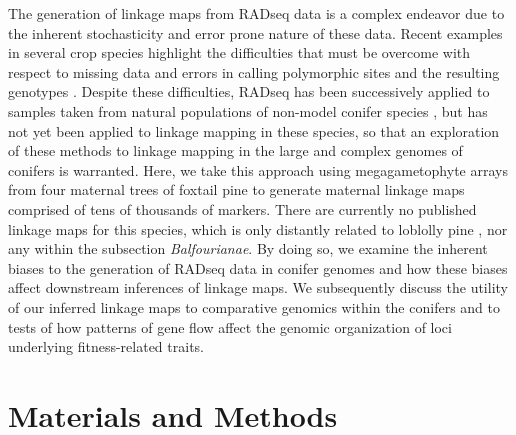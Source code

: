 \documentclass[11pt]{article}
\begin{document}
The generation of linkage maps from RADseq data is a complex endeavor due to the inherent stochasticity
and error prone nature of these data. Recent examples in several crop species highlight the
difficulties that must be overcome with respect to missing data and errors in calling polymorphic sites 
and the resulting genotypes \citep{Pfender:2011, Ward:2013}. Despite these difficulties, RADseq has been 
successively applied to samples taken from natural populations of non-model conifer species \citep{Parchman:2012}, but has not yet 
been applied to linkage mapping in these species, so that an exploration of these methods to linkage mapping in the large and complex 
genomes of conifers is warranted. Here, we take this approach using megagametophyte arrays from four maternal trees of foxtail pine
to generate maternal linkage maps comprised of tens of thousands of markers. There are currently no published linkage 
maps for this species, which is only distantly related to loblolly pine \citep{Eckert:2006a}, nor any within the subsection \textit{Balfourianae}. 
By doing so, we examine the inherent biases to the generation of RADseq data in conifer genomes and how these biases affect
downstream inferences of linkage maps. We subsequently discuss
the utility of our inferred linkage maps to comparative genomics within the conifers and to tests of how patterns of gene flow 
affect the genomic organization of loci underlying fitness-related traits.


\section*{Materials and Methods}
\end{document}
